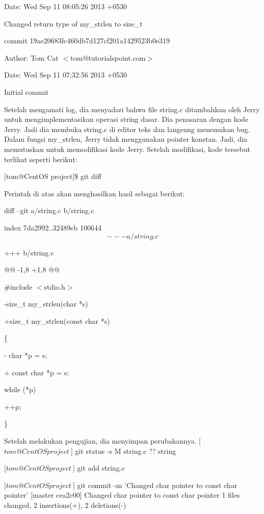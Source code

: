 Date: Wed Sep 11 08:05:26 2013 +0530

Changed return type of my\_strlen to size\_t

commit 19ae20683fc460db7d127cf201a1429523b0e319

Author: Tom Cat $<$tom@tutorialspoint.com$>$

Date: Wed Sep 11 07:32:56 2013 +0530

Initial commit\vspace{12pt}

Setelah mengamati log, dia menyadari bahwa file string.c ditambahkan 
oleh Jerry untuk mengimplementasikan operasi string dasar. Dia penasaran 
dengan kode Jerry. Jadi dia membuka string.c di editor teks dan langsung 
menemukan bug. Dalam fungsi my\_strlen, Jerry tidak menggunakan pointer 
konstan. Jadi, dia memutuskan untuk memodifikasi kode Jerry. Setelah 
modifikasi, kode tersebut terlihat seperti berikut:\vspace{12pt}

$[$tom@CentOS project$]$\$ git diff\vspace{12pt}

Perintah di atas akan menghasilkan hasil sebagai berikut:\vspace{12pt}

diff --git a/string.c b/string.c

index 7da2992..32489eb 100644
\begin{equation}
--- a/string.c
\end{equation}

+++ b/string.c

@@ -1,8 +1,8 @@

\#include $<$stdio.h$>$

-size\_t my\_strlen(char *s)

+size\_t my\_strlen(const char *s)

\{

 - char *p = s;

 + const char *p = s;

 while (*p)

 ++p;

\}\vspace{12pt}

Setelah melakukan pengujian, dia menyimpan perubahannya.\vspace{12pt}
[$tom@CentOS project ~$] git status -s
M string.c
?? string

[$tom@CentOS project ~$] git add string.c

[$tom@CentOS project ~$] git commit -m 'Changed char pointer to const char pointer'
[master cea2c00] Changed char pointer to const char pointer
1 files changed, 2 insertions(+), 2 deletions(-)

